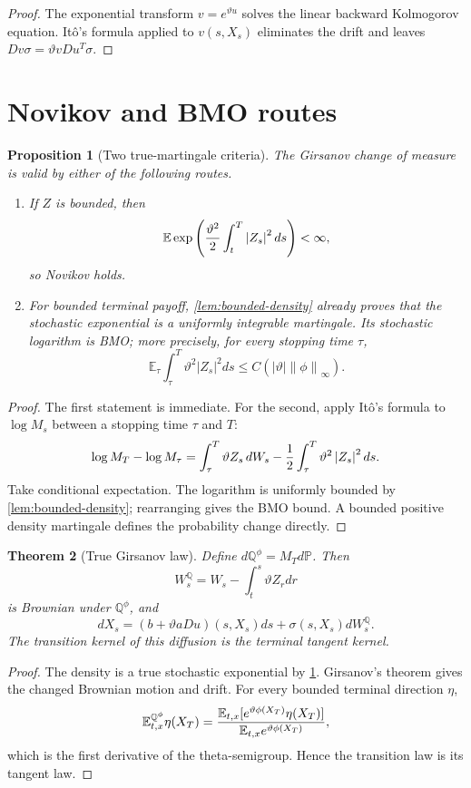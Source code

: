 \documentclass[11pt,reqno]{amsart}
\newtheorem{theorem}{Theorem}[section]
\newtheorem{proposition}[theorem]{Proposition}
\theoremstyle{definition}
\newcommand{\E}{\mathbb E}
\newcommand{\Pp}{\mathbb P}
\newcommand{\Qp}{\mathbb Q}
\newcommand{\norm}[1]{\left\lVert#1\right\rVert}
\newcommand{\abs}[1]{\left\lvert#1\right\rvert}
\begin{document}
\begin{proof}
The exponential transform $v=e^{\vartheta u}$ solves the linear backward
Kolmogorov equation.  It\^o's formula applied to $v(s,X_s)$ eliminates the
drift and leaves $Dv\sigma=\vartheta vDu^T\sigma$.
\end{proof}

\section{Novikov and BMO routes}

\begin{proposition}[Two true-martingale criteria]\label{prop:two-routes}
The Girsanov change of measure is valid by either of the following routes.

\begin{enumerate}
\item If $Z$ is bounded, then
\[
 \E\exp\left({\vartheta^2\over2}\int_t^T\abs{Z_s}^2ds\right)<\infty,
\]
so Novikov holds.
\item For bounded terminal payoff, \cref{lem:bounded-density} already proves
that the stochastic exponential is a uniformly integrable martingale.  Its
stochastic logarithm is BMO; more precisely, for every stopping time $\tau$,
\[
 \E_\tau\int_\tau^T\vartheta^2\abs{Z_s}^2ds
 \le C(\abs\vartheta\norm\phi_\infty).
\]
\end{enumerate}
\end{proposition}

\begin{proof}
The first statement is immediate.  For the second, apply It\^o's formula to
$\log M_s$ between a stopping time $\tau$ and $T$:
\[
 \log M_T-\log M_\tau
 =\int_\tau^T\vartheta Z_s\,dW_s
 -{1\over2}\int_\tau^T\vartheta^2\abs{Z_s}^2ds.
\]
Take conditional expectation.  The logarithm is uniformly bounded by
\cref{lem:bounded-density}; rearranging gives the BMO bound.  A bounded positive
density martingale defines the probability change directly.
\end{proof}

\begin{theorem}[True Girsanov law]\label{thm:true-Girsanov}
Define $d\Qp^\phi=M_Td\Pp$.  Then
\[
 W_s^{\Qp}=W_s-\int_t^s\vartheta Z_rdr
\]
is Brownian under $\Qp^\phi$, and
\[
 dX_s=(b+\vartheta aDu)(s,X_s)ds+\sigma(s,X_s)dW_s^{\Qp}.
\]
The transition kernel of this diffusion is the terminal tangent kernel.
\end{theorem}

\begin{proof}
The density is a true stochastic exponential by
\cref{prop:two-routes}.  Girsanov's theorem gives the changed Brownian motion
and drift.  For every bounded terminal direction $\eta$,
\[
 \E^{\Qp^\phi}_{t,x}\eta(X_T)
 ={\E_{t,x}[e^{\vartheta\phi(X_T)}\eta(X_T)]
  \over\E_{t,x}e^{\vartheta\phi(X_T)}},
\]
which is the first derivative of the theta-semigroup.  Hence the transition
law is its tangent law.
\end{proof}
\end{document}

